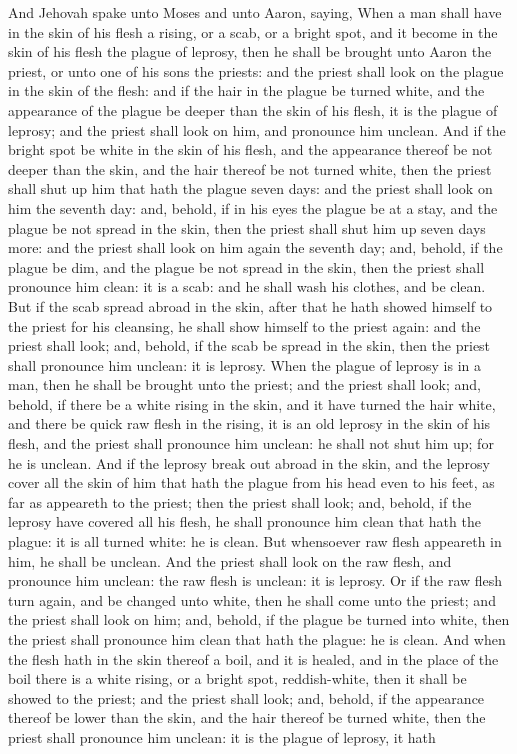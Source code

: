 And Jehovah spake unto Moses and unto Aaron, saying, When a man shall have in the skin of his flesh a rising, or a scab, or a bright spot, and it become in the skin of his flesh the plague of leprosy, then he shall be brought unto Aaron the priest, or unto one of his sons the priests: and the priest shall look on the plague in the skin of the flesh: and if the hair in the plague be turned white, and the appearance of the plague be deeper than the skin of his flesh, it is the plague of leprosy; and the priest shall look on him, and pronounce him unclean. And if the bright spot be white in the skin of his flesh, and the appearance thereof be not deeper than the skin, and the hair thereof be not turned white, then the priest shall shut up him that hath the plague seven days: and the priest shall look on him the seventh day: and, behold, if in his eyes the plague be at a stay, and the plague be not spread in the skin, then the priest shall shut him up seven days more: and the priest shall look on him again the seventh day; and, behold, if the plague be dim, and the plague be not spread in the skin, then the priest shall pronounce him clean: it is a scab: and he shall wash his clothes, and be clean. But if the scab spread abroad in the skin, after that he hath showed himself to the priest for his cleansing, he shall show himself to the priest again: and the priest shall look; and, behold, if the scab be spread in the skin, then the priest shall pronounce him unclean: it is leprosy.  When the plague of leprosy is in a man, then he shall be brought unto the priest; and the priest shall look; and, behold, if there be a white rising in the skin, and it have turned the hair white, and there be quick raw flesh in the rising, it is an old leprosy in the skin of his flesh, and the priest shall pronounce him unclean: he shall not shut him up; for he is unclean. And if the leprosy break out abroad in the skin, and the leprosy cover all the skin of him that hath the plague from his head even to his feet, as far as appeareth to the priest; then the priest shall look; and, behold, if the leprosy have covered all his flesh, he shall pronounce him clean that hath the plague: it is all turned white: he is clean. But whensoever raw flesh appeareth in him, he shall be unclean. And the priest shall look on the raw flesh, and pronounce him unclean: the raw flesh is unclean: it is leprosy. Or if the raw flesh turn again, and be changed unto white, then he shall come unto the priest; and the priest shall look on him; and, behold, if the plague be turned into white, then the priest shall pronounce him clean that hath the plague: he is clean.  And when the flesh hath in the skin thereof a boil, and it is healed, and in the place of the boil there is a white rising, or a bright spot, reddish-white, then it shall be showed to the priest; and the priest shall look; and, behold, if the appearance thereof be lower than the skin, and the hair thereof be turned white, then the priest shall pronounce him unclean: it is the plague of leprosy, it hath 